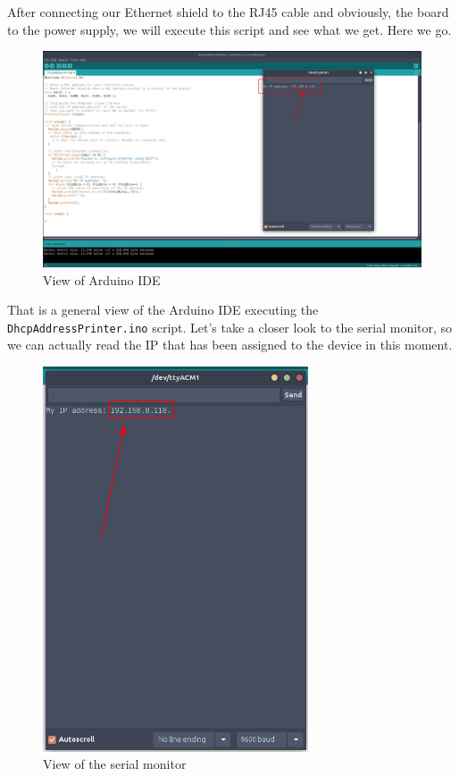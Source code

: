 After connecting our Ethernet shield to the RJ45 cable and obviously, the board to the power supply, we will execute this script and see what we get. Here we go.

\begin{figure}[H]
    \centering
    \includegraphics[width=1\textwidth]{fig/assign-ip.png}
    \caption{View of Arduino IDE}
    \label{fig:assign-ip}
\end{figure}

That is a general view of the Arduino IDE executing the \verb|DhcpAddressPrinter.ino| script. Let's take a closer look to the serial monitor, so we can actually read the IP that has been assigned to the device in this moment.

\begin{figure}[H]
    \centering
    \includegraphics[width=0.7\textwidth]{fig/serial-monitor-ip.png}
    \caption{View of the serial monitor}
    \label{fig:serial-monitor-ip}
\end{figure}

